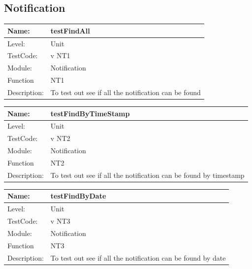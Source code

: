 \documentclass[12pt]{article}
\begin{document}
\subsection{Notification}
\begin{center}
\begin{tabular}{|l|p{12cm}|}
\hline

 Name: & testFindAll  \\
\hline
Level: & Unit \\
\hline
TestCode: & v NT1 \\
\hline
Module:& Notification\\
\hline
Function & NT1 \\
\hline
Description: & To test out see if all the notification can be found \\
\hline

\end{tabular}
\end{center}

\begin{center}
\begin{tabular}{|l|p{12cm}|}
\hline

 Name: & testFindByTimeStamp  \\
\hline
Level: & Unit \\
\hline
TestCode: & v NT2 \\
\hline
Module:& Notification\\
\hline
Function & NT2 \\
\hline
Description: & To test out see if all the notification can be found by timestamp \\
\hline

\end{tabular}
\end{center}

\begin{center}
\begin{tabular}{|l|p{12cm}|}
\hline

 Name: & testFindByDate  \\
\hline
Level: & Unit \\
\hline
TestCode: & v NT3 \\
\hline
Module:& Notification\\
\hline
Function & NT3 \\
\hline
Description: & To test out see if all the notification can be found by date \\
\hline

\end{tabular}
\end{center}
\end{document}
